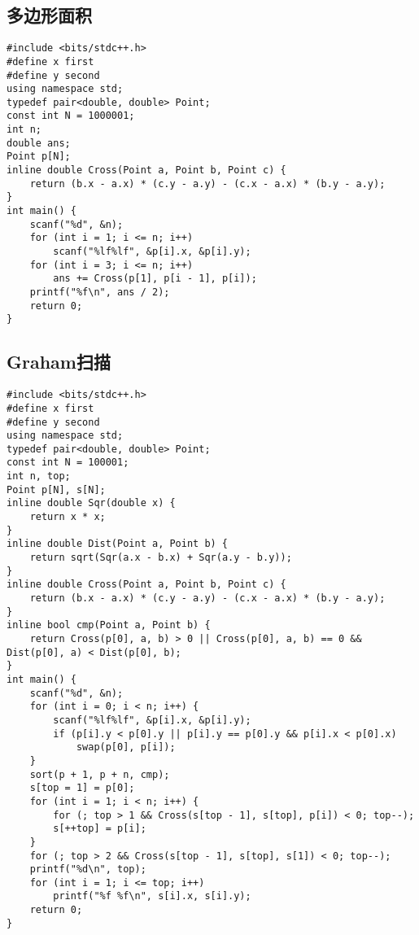 \documentclass[a4paper]{article}
\begin{document}
\subsection{多边形面积}
\begin{lstlisting}
#include <bits/stdc++.h>
#define x first
#define y second
using namespace std;
typedef pair<double, double> Point;
const int N = 1000001;
int n;
double ans;
Point p[N];
inline double Cross(Point a, Point b, Point c) {
    return (b.x - a.x) * (c.y - a.y) - (c.x - a.x) * (b.y - a.y);
}
int main() {
    scanf("%d", &n);
    for (int i = 1; i <= n; i++)
        scanf("%lf%lf", &p[i].x, &p[i].y);
    for (int i = 3; i <= n; i++)
        ans += Cross(p[1], p[i - 1], p[i]);
    printf("%f\n", ans / 2);
    return 0;
}
\end{lstlisting}
\subsection{Graham扫描}
\begin{lstlisting}
#include <bits/stdc++.h>
#define x first
#define y second
using namespace std;
typedef pair<double, double> Point;
const int N = 100001;
int n, top;
Point p[N], s[N];
inline double Sqr(double x) {
    return x * x;
}
inline double Dist(Point a, Point b) {
    return sqrt(Sqr(a.x - b.x) + Sqr(a.y - b.y));
}
inline double Cross(Point a, Point b, Point c) {
    return (b.x - a.x) * (c.y - a.y) - (c.x - a.x) * (b.y - a.y);
}
inline bool cmp(Point a, Point b) {
    return Cross(p[0], a, b) > 0 || Cross(p[0], a, b) == 0 && Dist(p[0], a) < Dist(p[0], b);
}
int main() {
    scanf("%d", &n);
    for (int i = 0; i < n; i++) {
        scanf("%lf%lf", &p[i].x, &p[i].y);
        if (p[i].y < p[0].y || p[i].y == p[0].y && p[i].x < p[0].x)
            swap(p[0], p[i]);
    }
    sort(p + 1, p + n, cmp);
    s[top = 1] = p[0];
    for (int i = 1; i < n; i++) {
        for (; top > 1 && Cross(s[top - 1], s[top], p[i]) < 0; top--);
        s[++top] = p[i];
    }
    for (; top > 2 && Cross(s[top - 1], s[top], s[1]) < 0; top--);
    printf("%d\n", top);
    for (int i = 1; i <= top; i++)
        printf("%f %f\n", s[i].x, s[i].y);
    return 0;
}
\end{lstlisting}
\end{document}
